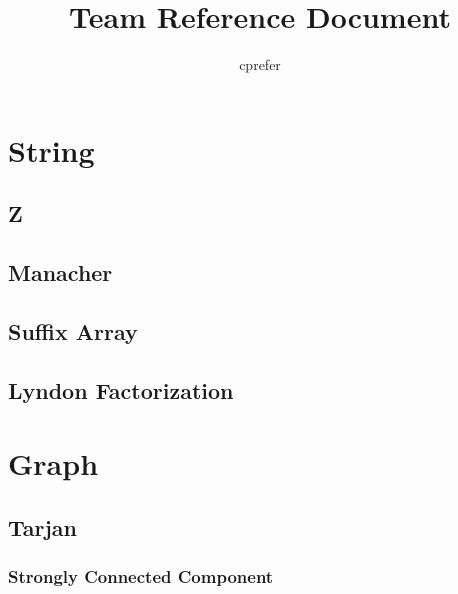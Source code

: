 \documentclass{article}
\begin{document}
\title{Team Reference Document}
\author{cprefer}
\maketitle
\newpage
\begin{multicols}{2}
    \tableofcontents
    \section{String}
    \subsection{Z}
    
    \subsection{Manacher}
    
    \subsection{Suffix Array}
    
    \subsection{Lyndon Factorization}
    

    \section{Graph}
    \subsection{Tarjan}
    \subsubsection{Strongly Connected Component}
    
\end{multicols}
\end{document}
